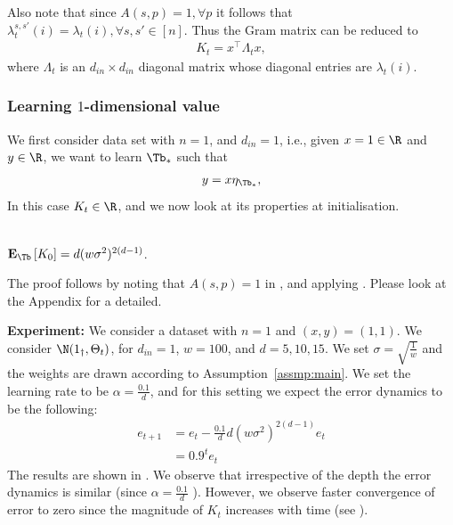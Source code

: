 Also note that since $A(s,p)=1,\forall p$ it follows that $\lambda^{s,s'}_t(i)=\lambda_t(i),\forall s,s'\in [n]$. Thus the Gram matrix can be reduced to 
\begin{align}
K_t=x^\top \Lambda_t x, 
\end{align}
where $\Lambda_t$ is an $d_{in}\times d_{in}$ diagonal matrix whose diagonal entries are $\lambda_t(i)$.

\subsubsection{Learning $1$-dimensional value}
We first consider data set with $n=1$, and $d_{in}=1$, i.e., given $x=1\in \R$ and $y\in \R$, we want to learn $\Tb_*$ such that 
\begin{align}
y=x\eta_{\Tb_*},
\end{align}
In this case $K_t\in \R$, and we now look at its properties at initialisation. 
\begin{corollary}\label{th:dln}\hfill\\
$\mathbf{E}_{\Tb}\left[K_0\right]=d(w\sigma^2)^{2(d-1)}$.
\end{corollary}
The proof follows by noting that $A(s,p)=1$ in , and applying .  Please look at the Appendix for a detailed.

\textbf{Experiment:} We consider a dataset with $n=1$ and $(x,y)=(1,1)$. We consider $\N(1_{\dagger},\Theta_t)$, for $d_{in}=1$, $w=100$, and $d=5,10,15$. We set $\sigma=\sqrt{\frac{1}{w}}$ and the weights are drawn according to Assumption~\ref{assmp:main}. We set the learning rate to be $\alpha=\frac{0.1}{d}$, and for this setting we expect the error dynamics to be the following:
\begin{align*}
e_{t+1}&=e_t-\frac{0.1}{d}d(w\sigma^2)^{2(d-1)}e_t\\
&=0.9^te_t
\end{align*}
The results are shown in . We observe that irrespective of the depth the error dynamics is similar (since $\alpha=\frac{0.1}{d}$ ). However, we observe faster convergence of error to zero since the magnitude of $K_t$ increases with time (see ).

